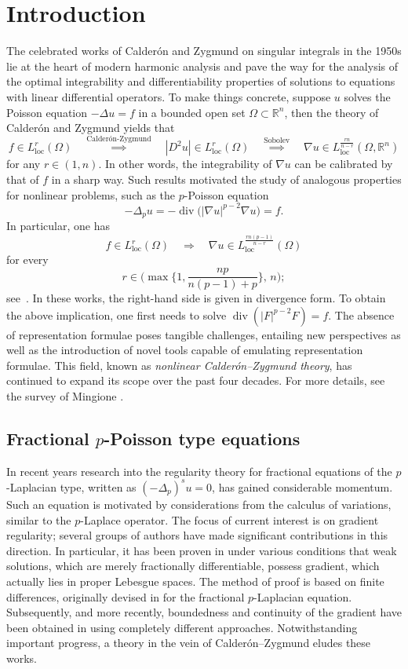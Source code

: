 \documentclass[10pt,letterpaper]{amsart}
\theoremstyle{definition}
\numberwithin{theorem}{section}
\numberwithin{equation}{section}
\renewcommand{\div}{\operatorname{div}}
\newcommand{\R}{\ensuremath{\mathbb{R}}}
\newcommand{\1}{\ensuremath{\mathds{1}}}
\DeclareMathOperator{\loc}{loc}
\numberwithin{equation}{section}
\begin{document}
\section{Introduction}
The celebrated works \cite{CZ-1,CZ-2} of Calder\'on and Zygmund on singular integrals in the 1950s lie at the heart of modern harmonic analysis and pave the way for the analysis of the optimal integrability and differentiability properties of solutions to equations with linear differential operators. To make things concrete, suppose $u$ solves the Poisson equation $-\Delta u=f$ in a bounded open set $\Omega \subset \R^n$, then the theory of Calder\'on and Zygmund yields that
\[
f\in L^r_{\loc}(\Omega)\quad\overset{\text{Calder\'on-Zygmund}}{\implies}\quad |D^2u| \in L^r_{\loc}(\Omega) \quad\overset{\text{Sobolev}}{\implies}\quad\nabla u\in L^{\frac{rn}{n-r}}_{\loc}(\Omega,\R^n)
\]
for any $r\in(1,n)$.
In other words, the integrability of $\nabla u$ can be calibrated by that of $f$ in a sharp way. Such results motivated the study of analogous properties for nonlinear
problems, such as the \(p\)-Poisson equation
\[
-\Delta_p u=-\div\big(|\nabla u|^{p-2}\nabla u\big)=f.
\]
In particular, one has
\[
f\in L^r_{\loc}(\Omega)
\quad\Longrightarrow\quad
\nabla u\in L^{\frac{rn(p-1)}{n-r}}_{\loc}(\Omega)
\]
for every
\[
r\in\bigg(\max\Big\{1,\frac{np}{n(p-1)+p}\Big\},\,n\bigg);
\]
see~\cite{AcMi, CP-98, DiBe-Man, Iwaniecz, Ki-Zh}. In these works, the right-hand side is given in divergence form. 
To obtain the above implication, one first needs to solve
$\operatorname{div} (|F|^{p-2}F )= f$. The absence of representation formulae poses tangible challenges, entailing new perspectives as well as the introduction of novel tools capable of emulating representation formulae. This field, known as {\it nonlinear Calder\'on--Zygmund theory}, has continued to expand its scope over the past four decades.  For more details, see the survey of Mingione \cite{Min-survey}. 

\subsection{Fractional $p$-Poisson type equations}In recent years research into the regularity theory for fractional equations of the $p$-Laplacian type, written as $\left( -\Delta_p\right)^s u=0$, has gained considerable momentum. Such an equation is motivated by considerations from the calculus of variations, similar to the $p$-Laplace operator. The focus of current interest is on gradient regularity; several groups of authors have made significant contributions in this direction. In particular, it has been proven in \cite{Brasco-Lindgren, BDLMS-1,  BDLMS-2, DKLN-higherdiff} under various conditions that weak solutions, which are merely fractionally differentiable, possess gradient, which actually lies in proper Lebesgue spaces. The method of proof is based on finite differences, originally devised in \cite{Brasco-Lindgren, Brasco-Lindgren-Schikorra} for the fractional $p$-Laplacian equation. Subsequently, and more recently, boundedness and continuity of the gradient have been obtained in \cite{BS-25, BT-25, GJS-25} using completely different approaches. Notwithstanding important progress, a theory in the vein of Calder\'on--Zygmund eludes these works.
\end{document}
